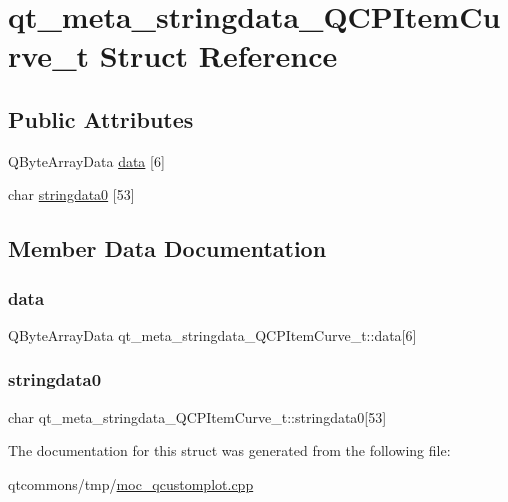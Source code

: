 \hypertarget{structqt__meta__stringdata___q_c_p_item_curve__t}{}\section{qt\+\_\+meta\+\_\+stringdata\+\_\+\+Q\+C\+P\+Item\+Curve\+\_\+t Struct Reference}
\label{structqt__meta__stringdata___q_c_p_item_curve__t}
\subsection*{Public Attributes}
\begin{DoxyCompactItemize}
\item 
Q\+Byte\+Array\+Data \mbox{\hyperlink{structqt__meta__stringdata___q_c_p_item_curve__t_ac6d43f09ee6cd9ad95da06d7fd942e8f}{data}} \mbox{[}6\mbox{]}
\item 
char \mbox{\hyperlink{structqt__meta__stringdata___q_c_p_item_curve__t_a52ddb589fe5c4e7eba75b1eb50799729}{stringdata0}} \mbox{[}53\mbox{]}
\end{DoxyCompactItemize}


\subsection{Member Data Documentation}
\mbox{\label{structqt__meta__stringdata___q_c_p_item_curve__t_ac6d43f09ee6cd9ad95da06d7fd942e8f}} 
\subsubsection{\texorpdfstring{data}{data}}
{\footnotesize\ttfamily Q\+Byte\+Array\+Data qt\+\_\+meta\+\_\+stringdata\+\_\+\+Q\+C\+P\+Item\+Curve\+\_\+t\+::data\mbox{[}6\mbox{]}}

\mbox{\label{structqt__meta__stringdata___q_c_p_item_curve__t_a52ddb589fe5c4e7eba75b1eb50799729}} 
\subsubsection{\texorpdfstring{stringdata0}{stringdata0}}
{\footnotesize\ttfamily char qt\+\_\+meta\+\_\+stringdata\+\_\+\+Q\+C\+P\+Item\+Curve\+\_\+t\+::stringdata0\mbox{[}53\mbox{]}}



The documentation for this struct was generated from the following file\+:\begin{DoxyCompactItemize}
\item 
qtcommons/tmp/\mbox{\hyperlink{moc__qcustomplot_8cpp}{moc\+\_\+qcustomplot.\+cpp}}\end{DoxyCompactItemize}
